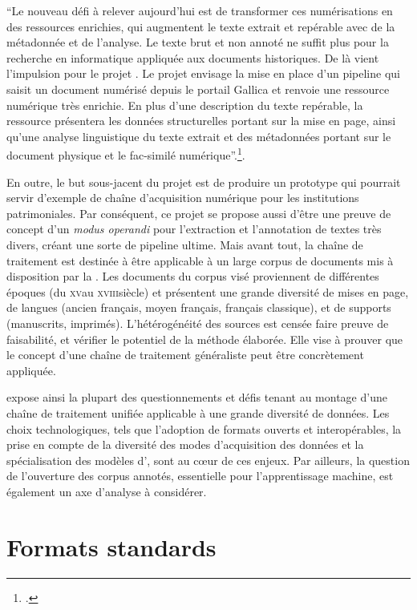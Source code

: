\begin{kwote}  
``Le nouveau défi à relever aujourd'hui est de transformer ces
numérisations en des ressources enrichies, qui augmentent le texte
extrait et repérable avec de la métadonnée et de l'analyse. Le texte
brut et non annoté ne suffit plus pour la recherche en informatique
appliquée aux documents historiques. De là vient l'impulsion pour le
projet \gaga. Le projet envisage la mise en place d'un pipeline
qui saisit un document numérisé depuis le portail Gallica et renvoie une
ressource numérique très enrichie. En plus d'une description du texte
repérable, la ressource présentera les données structurelles portant sur
la mise en page, ainsi qu'une analyse linguistique du texte extrait et
des métadonnées portant sur le document physique et le fac-similé
numérique''.\footcite{christensen_gallicorpor_2022}.
\end{kwote}

En outre, le but sous-jacent du projet est de produire un prototype qui
pourrait servir d'exemple de chaîne d'acquisition
numérique pour les institutions
patrimoniales. Par conséquent, ce projet se propose aussi d'être une
preuve de concept d'un \emph{modus operandi} pour l'extraction et
l'annotation de textes très divers, créant une sorte de pipeline ultime. Mais avant tout, la chaîne de traitement est destinée à être applicable
à un large corpus de documents mis à disposition par la \bnf. Les
documents du corpus visé proviennent de différentes époques (du \textsc{xv}\ieme au
\textsc{xviii}\ieme siècle) et présentent une grande diversité de mises en page, de
langues (ancien français, moyen français, français classique), et de
supports (manuscrits, imprimés). L'hétérogénéité des sources est censée
faire preuve de faisabilité, et vérifier le potentiel de la méthode
élaborée. Elle vise à prouver que le concept d'une chaîne de traitement
généraliste peut être concrètement appliquée.

\gaga expose ainsi la plupart des questionnements et défis
tenant au montage d'une chaîne de traitement unifiée applicable à une
grande diversité de données. Les choix technologiques, tels que
l'adoption de formats ouverts et interopérables, la prise en compte de
la diversité des modes d'acquisition des données et la spécialisation
des modèles d'\ia, sont au cœur de ces enjeux. Par ailleurs, la question
de l'ouverture des corpus annotés, essentielle pour l'apprentissage
machine, est également un axe d'analyse à considérer.

                \hypertarget{formats-standards}{\section{%
                Formats standards}\label{formats-standards}}
                    
                    
